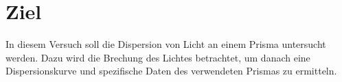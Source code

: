 \section{Ziel}
\label{sec:Ziel}
In diesem Versuch soll die Dispersion von Licht an einem Prisma untersucht werden.
Dazu wird die Brechung des Lichtes betrachtet, um danach eine Dispersionskurve und
spezifische Daten des verwendeten Prismas zu ermitteln.
